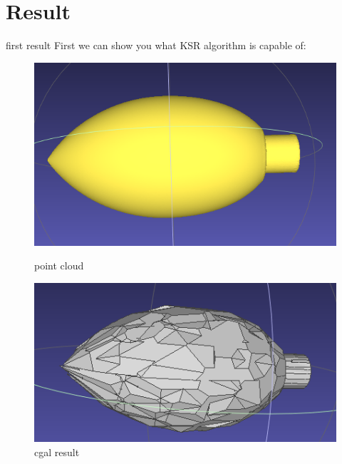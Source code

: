 \documentclass[10pt]{beamer}
\begin{document}
\section{Result}
\begin{frame}{first result}
First we can show you what KSR algorithm is capable of: 
\begin{figure}[H]
    \begin{minipage}[t]{0.33\textwidth}
        \includegraphics[width=\textwidth]{../../images/screen_kinetic/flame_point.png}
        \caption*{point cloud}
    \end{minipage}
    \begin{minipage}[t]{0.37\textwidth}
      \includegraphics[width=\textwidth]{../../images/screen_kinetic/flame_cgal.png}
      \caption*{cgal result}
    \end{minipage}
    \begin{minipage}[t]{0.32\textwidth}

\end{minipage}
\end{figure}
\end{frame}
\end{document}
